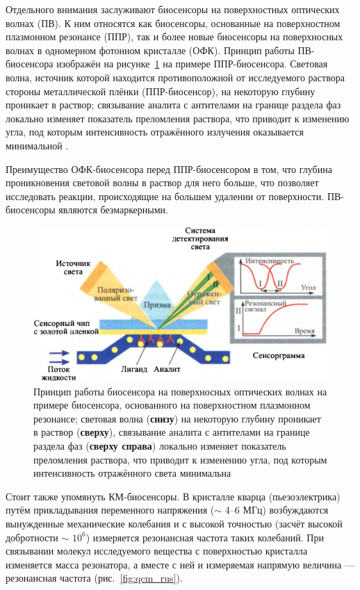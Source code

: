 \documentclass[oneside,final,12pt]{extreport}
\begin{document}
Отдельного внимания заслуживают биосенсоры на поверхностных оптических волнах (ПВ).
К ним относятся как биосенсоры, основанные на поверхностном плазмонном резонансе (ППР),
так и более новые биосенсоры на поверхносных волнах в одномерном фотонном кристалле (ОФК).
Принцип работы ПВ-биосенсора изображён на рисунке~\ref{fig:spr_biosensor_principle}
на примере ППР-биосенсора.
Световая волна, источник которой находится противоположной от исследуемого раствора
стороны металлической плёнки (ППР-биосенсор), %
на некоторую глубину проникает в раствор;
связывание аналита с антителами на границе раздела фаз
локально изменяет показатель преломления раствора, что приводит к изменению
угла, под которым интенсивность отражённого излучения оказывается минимальной%
\cite{bib:klimov_nanoplasmonics}.

Преимущество ОФК-биосенсора перед ППР-биосенсором в том,
что глубина проникновения световой волны в раствор для него больше,
что позволяет исследовать реакции, происходящие
на большем удалении от поверхности.
ПВ-биосенсоры являются безмаркерными.


\begin{figure}
  \centering
  \includegraphics[width=.8\textwidth]{pic/spr_biosensor_principle}

  \caption{%
    \label{fig:spr_biosensor_principle}%
    Принцип работы биосенсора на поверхносных оптических волнах
    на примере биосенсора, основанного на поверхностном плазмонном резонансе;
    световая волна (\textbf{снизу}) на некоторую глубину проникает в раствор (\textbf{сверху}),
    связывание аналита с антителами на границе раздела фаз (\textbf{сверху справа})
    локально изменяет показатель преломления раствора, что приводит к изменению
    угла, под которым интенсивность отражённого света минимальна
  }

\end{figure}

Стоит также упомянуть КМ-биосенсоры.
В кристалле кварца (пьезоэлектрика) путём прикладывания переменного напряжения
($\sim$ 4--6 МГц)
возбуждаются вынужденные механические колебания и с высокой точностью
(засчёт высокой добротности $\sim$ $10^6$)
измеряется резонансная частота таких колебаний.
При связывании молекул исследуемого вещества с поверхностью кристалла
изменяется масса резонатора, а вместе с ней и измеряемая напрямую величина ---
резонансная частота (рис.~\ref{fig:qcm_rus})\cite{bib:qcm_odor}.
\end{document}
